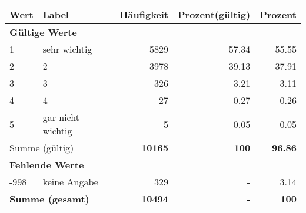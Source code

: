      \begin{longtable}{lXrrr}
     \toprule
     \textbf{Wert} & \textbf{Label} & \textbf{Häufigkeit} & \textbf{Prozent(gültig)} & \textbf{Prozent} \\
     \endhead
     \midrule
     \multicolumn{5}{l}{\textbf{Gültige Werte}}\\

     1 &
     \multicolumn{1}{X}{ sehr wichtig   } &


       \num{5829} &
       \num[round-mode=places,round-precision=2]{57,34} &
         \num[round-mode=places,round-precision=2]{55,55} \\

     2 &
     \multicolumn{1}{X}{ 2   } &


       \num{3978} &
       \num[round-mode=places,round-precision=2]{39,13} &
         \num[round-mode=places,round-precision=2]{37,91} \\

     3 &
     \multicolumn{1}{X}{ 3   } &


       \num{326} &
       \num[round-mode=places,round-precision=2]{3,21} &
         \num[round-mode=places,round-precision=2]{3,11} \\

     4 &
     \multicolumn{1}{X}{ 4   } &


       \num{27} &
       \num[round-mode=places,round-precision=2]{0,27} &
         \num[round-mode=places,round-precision=2]{0,26} \\

     5 &
     \multicolumn{1}{X}{ gar nicht wichtig   } &


       \num{5} &
       \num[round-mode=places,round-precision=2]{0,05} &
         \num[round-mode=places,round-precision=2]{0,05} \\
     \midrule
     \multicolumn{2}{l}{Summe (gültig)} &
       \textbf{\num{10165}} &
     \textbf{100} &
       \textbf{\num[round-mode=places,round-precision=2]{96,86}} \\
     \multicolumn{5}{l}{\textbf{Fehlende Werte}}\\
       -998 &
       keine Angabe &
         \num{329} &
        - &
         \num[round-mode=places,round-precision=2]{3,14} \\
     \midrule
     \multicolumn{2}{l}{\textbf{Summe (gesamt)}} &
          \textbf{\num{10494}} &
        \textbf{-} &
        \textbf{100} \\
     \bottomrule
     \end{longtable}
     
